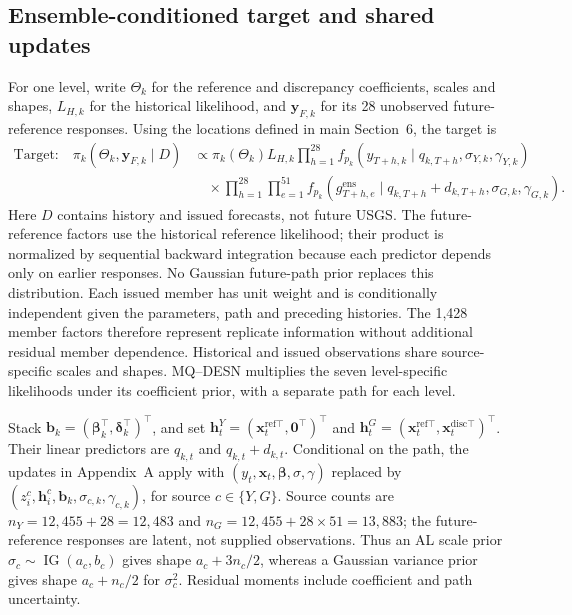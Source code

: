 \documentclass[12pt,letterpaper]{article}
\newcommand{\vect}[1]{\bm{#1}}
\newcommand{\IG}{\operatorname{IG}}
\numberwithin{suppalgorithm}{section}
\numberwithin{equation}{section}
\numberwithin{table}{section}
\numberwithin{figure}{section}
\begin{document}
\subsection{Ensemble-conditioned target and shared updates}
\label{subsec:glofas_likelihoods}

For one level, write \(\Theta_k\) for the reference and discrepancy
coefficients, scales and shapes, \(L_{H,k}\) for the historical
likelihood, and \(\vect y_{F,k}\) for its 28 unobserved future-reference
responses. Using the locations defined in main Section~6, the target is
\begin{equation}
\begin{aligned}
\text{Target:}\quad
\pi_k(\Theta_k,\vect y_{F,k}\mid D)
&\propto\pi_k(\Theta_k)L_{H,k}
\prod_{h=1}^{28}f_{p_k}(y_{T+h,k}\mid q_{k,T+h},\sigma_{Y,k},\gamma_{Y,k})\\
&\quad\times\prod_{h=1}^{28}\prod_{e=1}^{51}
f_{p_k}(g_{T+h,e}^{\mathrm{ens}}\mid
q_{k,T+h}+d_{k,T+h},\sigma_{G,k},\gamma_{G,k}).
\end{aligned}
\label{eq:supp_glofas_unit_member_target}
\end{equation}
Here \(D\) contains history and issued forecasts, not future USGS.
The future-reference factors use the historical reference likelihood;
their product is normalized by sequential backward integration because
each predictor depends only on earlier responses. No Gaussian future-path
prior replaces this distribution. Each issued member has unit weight and
is conditionally independent given the parameters, path and preceding
histories. The 1,428 member factors therefore represent replicate
information without additional residual member dependence. Historical and
issued observations share source-specific scales and shapes. MQ--DESN
multiplies the seven level-specific likelihoods under its coefficient prior,
with a separate path for each level.

Stack \(\vect b_k=(\vect\beta_k^\top,\vect\delta_k^\top)^\top\),
and set \(\vect h_t^Y=(\vect x_t^{\mathrm{ref}\top},\vect0^\top)^\top\)
and \(\vect h_t^G=(\vect x_t^{\mathrm{ref}\top},
\vect x_t^{\mathrm{disc}\top})^\top\). Their linear predictors are
\(q_{k,t}\) and \(q_{k,t}+d_{k,t}\). Conditional on the path, the
updates in Appendix~A apply with
\((y_t,\vect x_t,\vect\beta,\sigma,\gamma)\) replaced by
\((z_i^c,\vect h_i^c,\vect b_k,\sigma_{c,k},\gamma_{c,k})\),
for source \(c\in\{Y,G\}\). Source counts are
\(n_Y=12{,}455+28=12{,}483\) and
\(n_G=12{,}455+28\times51=13{,}883\); the future-reference responses
are latent, not supplied observations. Thus an AL scale prior
\(\sigma_c\sim\IG(a_c,b_c)\) gives shape \(a_c+3n_c/2\), whereas
a Gaussian variance prior gives shape \(a_c+n_c/2\) for
\(\sigma_c^2\). Residual moments include coefficient and path uncertainty.
\end{document}
